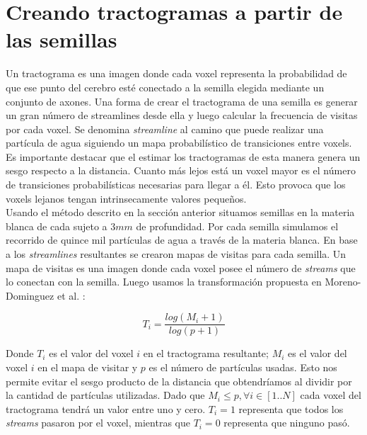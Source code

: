 \section{Creando tractogramas a partir de las semillas}

Un tractograma es una imagen donde cada voxel representa la probabilidad de que
ese punto del cerebro est\'e conectado a la semilla elegida mediante un conjunto
de axones. Una forma de crear el tractograma de una semilla es generar un gran
n\'umero de streamlines desde ella y luego calcular la frecuencia de visitas por
cada voxel. Se denomina \textit{streamline} al camino que puede realizar una
part\'icula de agua siguiendo un mapa probabil\'istico de transiciones entre voxels.
Es importante destacar que el estimar los tractogramas de esta manera genera un 
sesgo respecto a la distancia. Cuanto m\'as lejos est\'a un voxel mayor es el 
n\'umero de transiciones probabil\'isticas necesarias para llegar a \'el. Esto 
provoca que los voxels lejanos tengan intrinsecamente valores peque\~nos. \\

Usando el m\'etodo descrito en la secci\'on anterior situamos semillas en la 
materia blanca de cada sujeto a $3mm$ de profundidad. Por cada semilla simulamos
el recorrido de quince mil part\'iculas de agua a trav\'es de la materia blanca. 
En base a los \textit{streamlines} resultantes se crearon mapas de visitas para
cada semilla. Un mapa de visitas es una imagen donde cada voxel posee el n\'umero
de \textit{streams} que lo conectan con la semilla. Luego usamos la transformaci\'on
propuesta en Moreno-Dominguez et al. \cite{Moreno-Dominguez2014}:

$$ T_i = \frac{ log(M_i + 1)}{log(p+1)} $$

Donde $T_i$ es el valor del voxel $i$ en el tractograma resultante; $M_i$ es 
el valor del voxel $i$ en el mapa de visitar y $p$ es el n\'umero de part\'iculas
usadas. Esto nos permite evitar el sesgo producto de la distancia que obtendr\'iamos
al dividir por la cantidad de part\'iculas utilizadas. Dado que 
$M_i \leq p, \forall i \in [1..N]$ cada voxel del tractograma tendr\'a un valor
entre uno y cero. $T_i = 1$ representa que todos los \textit{streams} pasaron por
el voxel, mientras que $T_i = 0$ representa que ninguno pas\'o. \\
